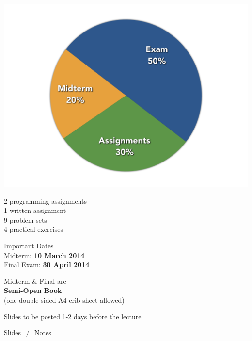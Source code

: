 \begin{frame}
\begin{center}
	\includegraphics[scale=0.3]{figures/assessment-chart.png}
\end{center}
\end{frame}

\begin{cf}{
2 programming assignments\\
1 written assignment\\
9 problem sets\\
4 practical exercises\\
}
\end{cf}

\begin{cf}{
Important Dates\\
Midterm: \textbf{10 March 2014}\\
Final Exam: \textbf{30 April 2014}
}
\end{cf}

\begin{cf}{
Midterm \& Final are\\
\textbf{Semi-Open Book}\\
\normalsize
(one double-sided A4 crib sheet allowed)
}
\end{cf}

\begin{frame}
\begin{center}
\large
Slides to be posted 1-2 days before the lecture
\end{center}
\end{frame}

\begin{frame}
\begin{center}
\large
Slides $\not=$ Notes
\end{center}
\end{frame}

